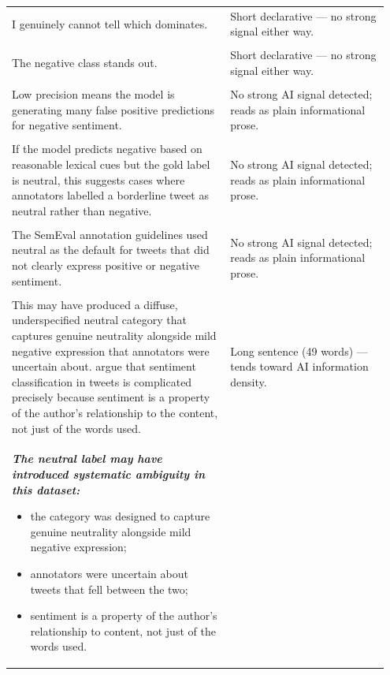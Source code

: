 \documentclass[11pt]{article}
\begin{document}
\begin{longtable}{|p{0.55\linewidth}|p{0.40\linewidth}|}
\hline
\rule{0pt}{3.5cm} & \\
\hline
I genuinely cannot tell which dominates. & Short declarative --- no strong signal either way. \\[2pt]
\hline
\rule{0pt}{3.5cm} & \\
\hline
The negative class stands out. & Short declarative --- no strong signal either way. \\[2pt]
\hline
\rule{0pt}{3.5cm} & \\
\hline
Low precision means the model is generating many false positive predictions for negative sentiment. & No strong AI signal detected; reads as plain informational prose. \\[2pt]
\hline
\rule{0pt}{3.5cm} & \\
\hline
If the model predicts negative based on reasonable lexical cues but the gold label is neutral, this suggests cases where annotators labelled a borderline tweet as neutral rather than negative. & No strong AI signal detected; reads as plain informational prose. \\[2pt]
\hline
\rule{0pt}{3.5cm} & \\
\hline
The SemEval annotation guidelines used neutral as the default for tweets that did not clearly express positive or negative sentiment. & No strong AI signal detected; reads as plain informational prose. \\[2pt]
\hline
\rule{0pt}{3.5cm} & \\
\hline
This may have produced a diffuse, underspecified neutral category that captures genuine neutrality alongside mild negative expression that annotators were uncertain about. argue that sentiment classification in tweets is complicated precisely because sentiment is a property of the author's relationship to the content, not just of the words used. & Long sentence (49 words) --- tends toward AI information density. \\[2pt]
\hline
{\bfseries\itshape The neutral label may have introduced systematic ambiguity in this dataset:
\begin{itemize}[leftmargin=*,topsep=2pt,itemsep=1pt,parsep=0pt]
  \item the category was designed to capture genuine neutrality alongside mild negative expression;
  \item annotators were uncertain about tweets that fell between the two;
  \item sentiment is a property of the author's relationship to content, not just of the words used.
\end{itemize}}\vspace{2em} & \\

\end{longtable}
\end{document}
